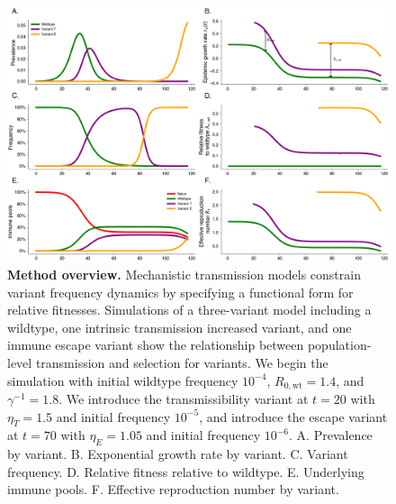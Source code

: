 \documentclass[12pt,oneside,letterpaper]{article}
\newcommand{\wt}{\text{wt}}
\def\tbc#1{\textcolor{purple}{[#1]}}
\begin{document}
\begin{figure}[h]
    \centering
    \includegraphics[width=1.0\linewidth]{./figures/vis_mechanisms.png}
    \caption{\textbf{Method overview.}
    Mechanistic transmission models constrain variant frequency dynamics by specifying a functional form for relative fitnesses.
    Simulations of a three-variant model including a wildtype, one intrinsic transmission increased variant, and one immune escape variant show the relationship between population-level transmission and selection for variants.
    We begin the simulation with initial wildtype frequency $10^{-4}$, $R_{0,\wt} = 1.4$, and $\gamma^{-1} = 1.8$.
    We introduce the transmissibility variant at $t=20$ with $\eta_T = 1.5$ and initial frequency $10^{-5}$, and introduce the escape variant at $t=70$ with $\eta_E = 1.05$ and initial frequency $10^{-6}$.
    A. Prevalence by variant.
    B. Exponential growth rate by variant.
    C. Variant frequency.
    D. Relative fitness relative to wildtype.
    E. Underlying immune pools.
    F. Effective reproduction number by variant.
}%
    \label{fig:vis_mechanisms}
\end{figure}
\end{document}
